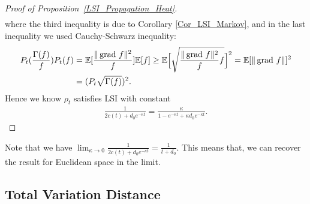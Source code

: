 \begin{proof}[Proof of Proposition~\ref{LSI_Propagation_Heat}]
\begin{align*}
    \end{align*}
    where the third inequality is due to Corollary \ref{Cor_LSI_Markov}, 
    and in the last inequality we used Cauchy-Schwarz inequality: 
    \begin{align*}
            P_{t}(\frac{\Gamma(f)}{f}) P_{t}(f) 
            &= \mathbb{E}[\frac{\|\operatorname{grad\,} f\|^{2}}{f}] \mathbb{E}[f] \ge \mathbb{E}\Big[\sqrt{\frac{\|\operatorname{grad\,} f\|^{2}}{f} f} \Big]^{2} 
            = \mathbb{E}[\|\operatorname{grad\,} f\|]^{2} \\
            &= (P_{t}\sqrt{\Gamma(f)})^{2}.
    \end{align*}
    Hence we know $\rho_{t}$ satisfies LSI with constant 
    \begin{align*}
        \frac{1}{2c(t) + d_{0}e^{-\kappa t}} 
        = \frac{\kappa}{1 - e^{-\kappa t} + \kappa d_{0}e^{-\kappa t}}.
    \end{align*}
\end{proof}

Note that we have $\lim_{\kappa \to 0} \frac{1}{2c(t) + d_{0}e^{-\kappa t}} = \frac{1}{t + d_{0}}$. This means that, we can recover the result for Euclidean space in the limit.

\subsection{Total Variation Distance}

